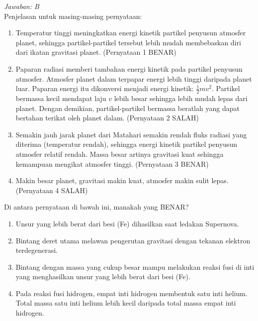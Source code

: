 \documentclass[11pt,fleqn, a4paper]{exam}
\begin{document}
\begin{questions}
\textit{Jawaban: B}\\
Penjelasan untuk masing-masing pernyataan:
\begin{enumerate}
\item Temperatur tinggi meningkatkan energi kinetik partikel penyusun atmosfer planet, sehingga partikel-partikel tersebut lebih mudah membebaskan diri dari ikatan gravitasi planet. (Pernyataan 1 BENAR)
\item Paparan radiasi memberi tambahan energi kinetik pada partikel penyusun atmosfer. Atmosfer planet dalam terpapar energi lebih tinggi daripada planet luar. Paparan energi itu dikonversi menjadi energi kinetik: $\frac{1}{2}mv^2$. Partikel bermassa kecil mendapat laju $v$ lebih besar sehingga lebih mudah lepas dari planet. Dengan demikian, partikel-partikel bermassa beratlah yang dapat bertahan terikat oleh planet dalam. (Pernyataan 2 SALAH)
\item Semakin jauh jarak planet dari Matahari semakin rendah fluks radiasi yang diterima (temperatur rendah), sehingga energi kinetik partikel penyusun atmosfer relatif rendah. Massa besar artinya gravitasi kuat sehingga kemampuan mengikat atmosfer tinggi. (Pernyataan 3 BENAR)
\item Makin besar planet, gravitasi makin kuat, atmosfer makin sulit lepas. (Pernyataan 4 SALAH)
\end{enumerate}

\vspace{0.5cm}
\question Di antara pernyataan di bawah ini, manakah yang BENAR?
\begin{enumerate}
\item Unsur yang lebih berat dari besi (Fe) dihasilkan saat ledakan Supernova.
\item Bintang deret utama melawan pengerutan gravitasi dengan tekanan elektron terdegenerasi. 
\item Bintang dengan massa yang cukup besar mampu melakukan reaksi fusi di inti yang menghasilkan unsur yang lebih berat dari besi (Fe).
\item Pada reaksi fusi hidrogen, empat inti hidrogen membentuk satu inti helium.  Total massa satu inti helium lebih kecil daripada total massa empat inti hidrogen.
\end{enumerate}


\end{questions}
\end{document}
